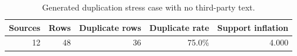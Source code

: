 \begin{table}[t]
  \caption{Generated duplication stress case with no third-party text.}
  \label{tab:controlled-duplication}
  \centering
  \small
  \begin{tabular}{rrrrr}
    \toprule
    Sources & Rows & Duplicate rows & Duplicate rate & Support inflation \\
    \midrule
    12 & 48 & 36 & 75.0\% & 4.000 \\
    \bottomrule
  \end{tabular}
\end{table}
